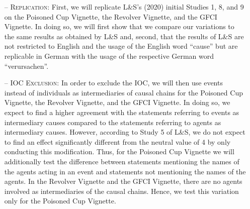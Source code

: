 \documentclass[egregdoesnotlikesansseriftitles,12pt]{scrartcl}
\begin{document}
\begin{itemize}
   \item[--]\textsc{Replication:} First, we will replicate L\&S's (2020) initial Studies 1, 8, and 9 on the Poisoned Cup Vignette, the Revolver Vignette, and the GFCI Vignette. In doing so, we will first show that we compare our variations to the same results as obtained by L\&S and, second, that the results of L\&S are not restricted to English and the usage of the English word ``cause'' but are replicable in German with the usage of the respective German word ``verursachen''.
   \item[--]\textsc{IOC Exclusion:} In order to exclude the IOC, we will then use events instead of individuals as intermediaries of causal chains for the Poisoned Cup Vignette, the Revolver Vignette, and the GFCI Vignette. In doing so, we expect to find a higher agreement with the statements referring to events as intermediary causes compared to the statements referring to agents as intermediary causes. However, according to Study 5 of L\&S, we do not expect to find an effect significantly different from the neutral value of 4 by only conducting this modification. Thus, for the Poisoned Cup Vignette we will additionally test the difference between statements mentioning the names of the agents acting in an event and statements not mentioning the names of the agents. In the Revolver Vignette and the GFCI Vignette, there are no agents involved as intermediaries of the causal chains. Hence, we test this variation only for the Poisoned Cup Vignette.

\end{itemize}
\end{document}
